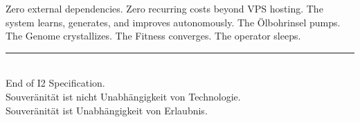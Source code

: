 \documentclass[11pt,a4paper]{article}
\begin{document}
Zero external dependencies. Zero recurring costs beyond 
VPS hosting. The system learns, generates, and improves 
autonomously. The \"Olbohrinsel pumps. The Genome crystallizes. 
The Fitness converges. The operator sleeps.

\vfill
\begin{center}
\color{isls-gray}\rule{0.5\textwidth}{0.4pt}\\[0.5em]
{\small End of I2 Specification.\\[0.3em]
Souver\"anit\"at ist nicht Unabh\"angigkeit von Technologie.\\
Souver\"anit\"at ist Unabh\"angigkeit von Erlaubnis.}
\end{center}
\end{document}
